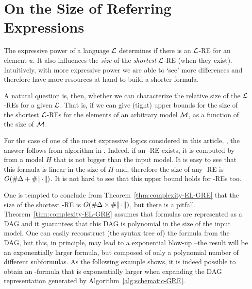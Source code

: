 \section{On the Size of Referring Expressions} \label{sec:size}

The expressive power of a language $\mathcal{L}$ determines if there is an
$\mathcal{L}$-RE for an element $u$. It also influences the \emph{size} of
the \emph{shortest} $\mathcal{L}$-RE (when they exist). Intuitively, with
more expressive power we are able to `see' more differences and
therefore have more resources at hand to build a shorter formula.

A natural question is, then, whether we can characterize the relative size
of the $\mathcal{L}$-REs for a given $\mathcal{L}$. That is, if we can give (tight) upper
bounds for the size of the shortest $\mathcal{L}$-REs for the elements of an arbitrary
model $\mathcal{M}$, as a function of the size of $\mathcal{M}$.


For the case of one of the most expressive logics considered in this
article, \EPFOL, the answer follows from algorithm
 in . Indeed, if an
\EPFOL-RE exists, it is computed by 
from a model $H$ that is not bigger than the input model. It is easy
to see that this formula is linear in the size of $H$ and, therefore
the size of any \EPFOL-RE is $O(\# \Delta +
\# |\!|\cdot|\!|)$. It is not hard to see that this upper bound
holds for \FOL-REs too.%


One is tempted to conclude from Theorem~\ref{thm:complexity-EL-GRE}
that the size of the shortest \EL-RE is $O(\# \Delta \times
\# |\!|\cdot|\!|)$, but there is a pitfall.
Theorem~\ref{thm:complexity-EL-GRE} assumes that formulas are
represented as a DAG and it guarantees that this DAG is polynomial
in the size of the input model. One can easily reconstruct
 (the syntax tree of) the formula from the DAG, but this, in principle, may lead
 to a exponential blow-up --the result will be an exponentially larger formula,
 but composed of only a polynomial number of different subformulas.
%
As the following example shows, it is indeed possible to obtain an \EL-formula
that is exponentially larger when expanding the DAG representation
generated by Algorithm~\ref{alg:schematic-GRE}.


